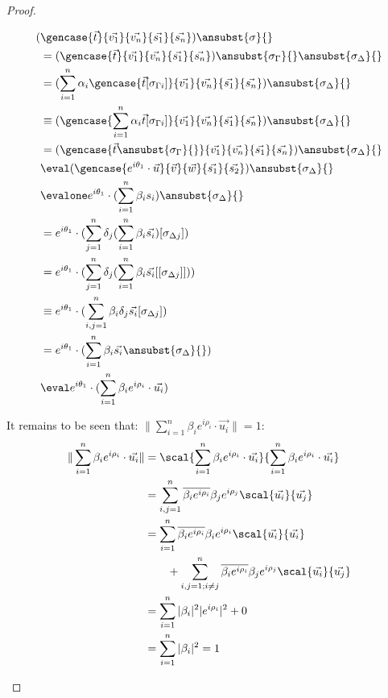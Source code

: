 \begin{proof}
\begin{description}
    \begin{align*}
        (&\gencase{\vec{t}}{\vec{v_1}}{\vec{v_n}}{\vec{s_1}}{\vec{s_n}})\ansubst{\sigma}{}\\ 
        &= (\gencase{\vec{t}}{\vec{v_1}}{\vec{v_n}}{\vec{s_1}}{\vec{s_n}})\ansubst{\sigma_\Gamma}{}\ansubst{\sigma_\Delta}{}\\
        &=(\sum_{i=1}^{n}\alpha_i \gencase{\vec{t}[\sigma_{\Gamma i}]}{\vec{v_1}}{\vec{v_n}}{\vec{s_1}}{\vec{s_n}})\ansubst{\sigma_\Delta}{} \\
        &\equiv (\gencase{\sum_{i=1}^{n} \alpha_i \vec{t}[\sigma_{\Gamma i}]}{\vec {v_1}}{\vec{v_n}}{\vec{s_1}}{\vec{s_n}})\ansubst{\sigma_\Delta}{}\\
        &=(\gencase{\vec{t}\ansubst{\sigma_\Gamma}{}}{\vec{v_1}}{\vec{v_n}}{\vec{s_1}}{\vec{s_n}})\ansubst{\sigma_\Delta}{}\\
        &\eval(\gencase{e^{i\theta_1}\cdot\vec{u}}{\vec{v}}{\vec{w}}{\vec{s_1}}{\vec{s_2}})\ansubst{\sigma_\Delta}{}\\
        &\evalone e^{i\theta_1}\cdot(\sum_{i=1}^{n}\beta_i s_i)\ansubst{\sigma_\Delta}{}\\
        &= e^{i\theta_1}\cdot(\sum_{j=1}^{n}\delta_j (\sum_{i=1}^{n}\beta_i \vec{s_i})[\sigma_{\Delta j}])\\
        &= e^{i\theta_1}\cdot(\sum_{j=1}^{n}\delta_j (\sum_{i=1}^{n}\beta_i \vec{s_i}[[\sigma_{\Delta j}]]))\\
        &\equiv e^{i\theta_1}\cdot(\sum_{i,j=1}^{n}\beta_i\delta_j\vec{s_i}[\sigma_{\Delta j}])\\
        &= e^{i\theta_1}\cdot(\sum_{i=1}^{n}\beta_i \vec{s_i}\ansubst{\sigma_\Delta}{})\\
        &\eval e^{i\theta_1}\cdot(\sum_{i=1}^{n}\beta_i e^{i\rho_i}\cdot\vec{u_i})
    \end{align*}
    
    It remains to be seen that: $\|\sum_{i=1}^{n}\beta_i e^{i\rho_i}\cdot\vec{u_i}\|=1$:
    \begin{align*}
        \|\sum_{i=1}^{n}\beta_i e^{i\rho_i}\cdot\vec{u_i}\| &= \scal{\sum_{i=1}^{n}\beta_i e^{i\rho_i}\cdot\vec{u_i}}{\sum_{i=1}^{n}\beta_i e^{i\rho_i}\cdot\vec{u_i}}\\
        &= \sum_{i,j=1}^{n}\overline{\beta_i e^{i\rho_i}}\beta_j e^{i\rho_j} \scal{\vec{u_i}}{\vec{u_j}}\\
        &= \sum_{i=1}^{n}\overline{\beta_i e^{i\rho_i}}\beta_i e^{i\rho_i} \scal{\vec{u_i}}{\vec{u_i}}\\
        &\qquad + \sum_{i,j=1; i\neq j}^{n}\overline{\beta_i e^{i\rho_i}}\beta_j e^{i\rho_j} \scal{\vec{u_i}}{\vec{u_j}}\\
        &= \sum_{i=1}^{n}|\beta_i|^2 |e^{i\rho_i}|^2  + 0\\
        &= \sum_{i=1}^{n}|\beta_i|^2 = 1
    \end{align*}


\end{description}
\end{proof}
